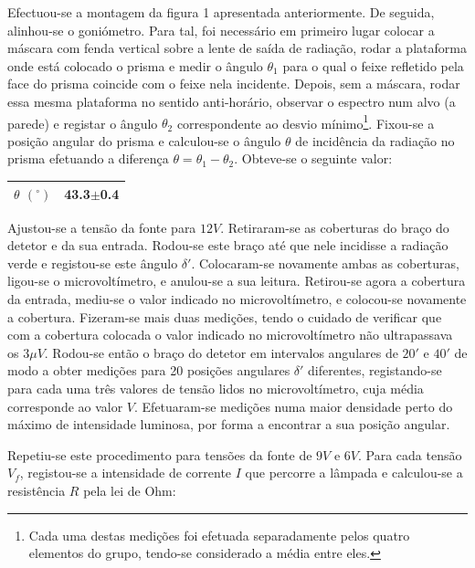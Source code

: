 \documentclass[9pt]{extarticle}
\begin{document}
\begin{multicols}{2}
\par Efectuou-se a montagem da figura 1 apresentada anteriormente. De seguida, alinhou-se o goniómetro. Para tal, foi necessário em primeiro lugar colocar a máscara com fenda vertical sobre a lente de saída de radiação, rodar a plataforma onde está colocado o prisma e medir o ângulo $\theta_1$ para o qual o feixe refletido pela face do prisma coincide com o feixe nela incidente. Depois, sem a máscara, rodar essa mesma plataforma no sentido anti-horário, observar o espectro num alvo (a parede) e registar o ângulo $\theta_2$ correspondente ao desvio mínimo\footnote{Cada uma destas medições foi efetuada separadamente pelos quatro elementos do grupo, tendo-se considerado a média entre eles.}. Fixou-se a posição angular do prisma e calculou-se o ângulo $\theta$ de incidência da radiação no prisma efetuando a diferença $\theta= \theta_1-\theta_2$. Obteve-se o seguinte valor:

\begin{center}
\begin{tabular}{ x{1cm} x{2cm} }
\hline \hline
$\theta$ $(^\circ)$ & 43.3$\pm$0.4 \tabularnewline
\hline \hline
\end{tabular}
\end{center}

\par Ajustou-se a tensão da fonte para $12V$. Retiraram-se as coberturas do braço do detetor e da sua entrada. Rodou-se este braço até que nele incidisse a radiação verde e registou-se este ângulo $\delta'$. Colocaram-se novamente ambas as coberturas, ligou-se o microvoltímetro, e anulou-se a sua leitura. Retirou-se agora a cobertura da entrada, mediu-se o valor indicado no microvoltímetro, e colocou-se novamente a cobertura. Fizeram-se mais duas medições, tendo o cuidado de verificar que com a cobertura colocada o valor indicado no microvoltímetro não ultrapassava os $3\mu V$. Rodou-se então o braço do detetor em intervalos angulares de $20'$ e $40'$ de modo a obter medições para 20 posições angulares $\delta'$ diferentes, registando-se para cada uma três valores de tensão lidos no microvoltímetro, cuja média corresponde ao valor $V$. Efetuaram-se medições numa maior densidade perto do máximo de intensidade luminosa, por forma a encontrar a sua posição angular.

\par Repetiu-se este procedimento para tensões da fonte de $9V$ e $6V$. Para cada tensão $V_f$, registou-se a intensidade de corrente $I$ que percorre a lâmpada e calculou-se a resistência $R$ pela lei de Ohm:


\end{multicols}
\end{document}
